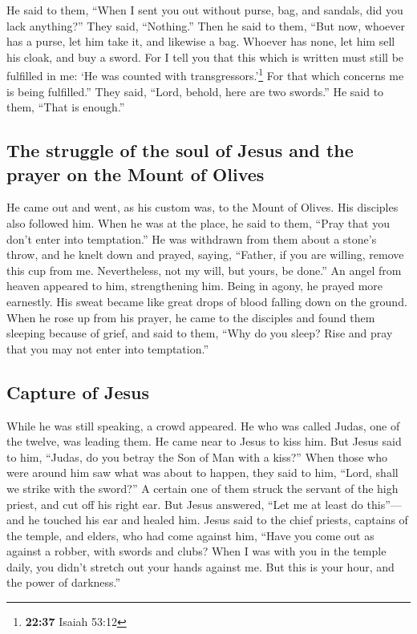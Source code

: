  He said to them, ``When I sent you out without purse,
bag, and sandals, did you lack anything?'' They said, ``Nothing.''
 Then he said to them, ``But now, whoever has a purse,
let him take it, and likewise a bag. Whoever has none, let him sell his
cloak, and buy a sword.  For I tell you that this which
is written must still be fulfilled in me: `He was counted with
transgressors.'\footnote{\textbf{22:37} Isaiah 53:12} For that which
concerns me is being fulfilled.''  They said, ``Lord,
behold, here are two swords.'' He said to them, ``That is enough.''

\hypertarget{the-struggle-of-the-soul-of-jesus-and-the-prayer-on-the-mount-of-olives}{%
\subsection{The struggle of the soul of Jesus and the prayer on the
Mount of
Olives}\label{the-struggle-of-the-soul-of-jesus-and-the-prayer-on-the-mount-of-olives}}

 He came out and went, as his custom was, to the Mount of
Olives. His disciples also followed him.  When he was at
the place, he said to them, ``Pray that you don't enter into
temptation.''  He was withdrawn from them about a stone's
throw, and he knelt down and prayed,  saying, ``Father,
if you are willing, remove this cup from me. Nevertheless, not my will,
but yours, be done.''  An angel from heaven appeared to
him, strengthening him.  Being in agony, he prayed more
earnestly. His sweat became like great drops of blood falling down on
the ground.  When he rose up from his prayer, he came to
the disciples and found them sleeping because of grief, 
and said to them, ``Why do you sleep? Rise and pray that you may not
enter into temptation.''

\hypertarget{capture-of-jesus}{%
\subsection{Capture of Jesus}\label{capture-of-jesus}}

 While he was still speaking, a crowd appeared. He who
was called Judas, one of the twelve, was leading them. He came near to
Jesus to kiss him.  But Jesus said to him, ``Judas, do
you betray the Son of Man with a kiss?''  When those who
were around him saw what was about to happen, they said to him, ``Lord,
shall we strike with the sword?''  A certain one of them
struck the servant of the high priest, and cut off his right ear.
 But Jesus answered, ``Let me at least do this''---and he
touched his ear and healed him.  Jesus said to the chief
priests, captains of the temple, and elders, who had come against him,
``Have you come out as against a robber, with swords and clubs?
 When I was with you in the temple daily, you didn't
stretch out your hands against me. But this is your hour, and the power
of darkness.''

